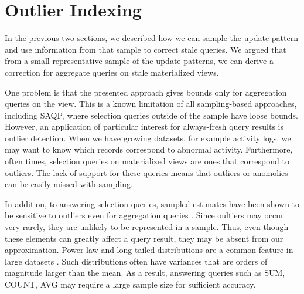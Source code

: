 \section{Outlier Indexing}\label{outlier}
In the previous two sections, we described how we can sample the update pattern and 
use information from that sample to correct stale queries.
We argued that from a small representative sample of the update patterns, we can derive 
a correction for aggregate queries on stale materialized views.

One problem is that the presented approach gives bounds only for aggregation queries on the view.
This is a known limitation of all sampling-based approaches, including SAQP, where selection queries outside of the sample have loose bounds.
However, an application of particular interest for always-fresh query results is outlier detection. 
When we have growing datasets, for example activity logs, we may want to know which records correspond to abnormal activity.
Furthermore, often times, selection queries on materialized views are ones that correspond to outliers.
The lack of support for these queries means that outliers or anomolies can be easily missed with sampling.

In addition, to answering selection queries, sampled estimates have been shown to be sensitive to outliers even for aggregation queries \cite{chaudhuri2001overcoming}.
Since oultiers may occur very rarely, they are unlikely to be represented in a sample.
Thus, even though these elements can greatly affect a query result, they may be absent from our approximation.
Power-law and long-tailed distributions are a common feature in large datasets \cite{clauset2009power}.
Such distributions often have variances that are orders of magnitude larger
than the mean.
As a result, answering queries such as SUM, COUNT, AVG may require a large 
sample size for sufficient accuracy.



